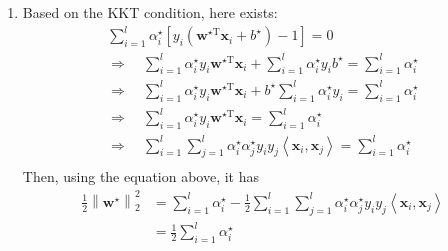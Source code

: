 \documentclass[a4paper]{article}
\begin{document}
\begin{enumerate}
\begin{enumerate}
  \item Based on the KKT condition, here exists:
    \begin{equation*}
      \begin{gathered}
        \sum_{i=1}^{l} \alpha_{i}^{\star}\left[y_{i}\left(\boldsymbol{w}^{\star \mathrm{T}} \boldsymbol{x}_{i}+b^{\star}\right)-1\right]=0\\
        \Rightarrow \quad \sum_{i=1}^{l} \alpha_{i}^{\star} y_{i} \boldsymbol{w}^{\star \mathrm{T}} \boldsymbol{x}_{i}+ \sum_{i=1}^{l} \alpha_{i}^{\star} y_{i} b^{\star} = \sum_{i=1}^{l} \alpha_{i}^{\star}\\
        \Rightarrow \quad \sum_{i=1}^{l} \alpha_{i}^{\star} y_{i} \boldsymbol{w}^{\star \mathrm{T}} \boldsymbol{x}_{i}+ b^{\star} \sum_{i=1}^{l} \alpha_{i}^{\star} y_{i} = \sum_{i=1}^{l} \alpha_{i}^{\star}\\
        \Rightarrow \quad \sum_{i=1}^{l} \alpha_{i}^{\star} y_{i} \boldsymbol{w}^{\star \mathrm{T}} \boldsymbol{x}_{i} = \sum_{i=1}^{l} \alpha_{i}^{\star}\\
        \Rightarrow \quad \sum_{i=1}^{l} \sum_{j=1}^{l} \alpha_{i}^{\star} \alpha_{j}^{\star} y_{i} y_{j}\left\langle\boldsymbol{x}_{i}, \boldsymbol{x}_{j}\right\rangle = \sum_{i=1}^{l} \alpha_{i}^{\star}\\
      \end{gathered}
    \end{equation*}
    Then, using the equation above, it has
    \begin{equation*}
      \begin{aligned}
        \frac{1}{2}\left\|\boldsymbol{w}^{\star}\right\|_{2}^{2}
        &=\sum_{i=1}^{l} \alpha_{i}^{\star}-\frac{1}{2} \sum_{i=1}^{l} \sum_{j=1}^{l} \alpha_{i}^{\star} \alpha_{j}^{\star} y_{i} y_{j}\left\langle\boldsymbol{x}_{i}, \boldsymbol{x}_{j}\right\rangle\\
        &=\frac{1}{2} \sum_{i=1}^{l} \alpha_{i}^{\star}\\
      \end{aligned}
    \end{equation*}
\end{enumerate}


\end{enumerate}
\end{document}
